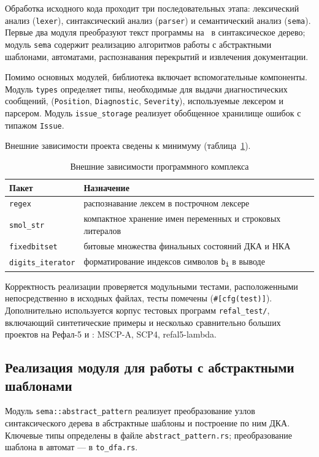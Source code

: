 Обработка исходного кода проходит три последовательных этапа: лексический анализ (\texttt{lexer}), синтаксический анализ (\texttt{parser}) и семантический анализ (\texttt{sema}).
Первые два модуля преобразуют текст программы на \RL\ в синтаксическое дерево; модуль \texttt{sema} содержит реализацию алгоритмов работы с абстрактными шаблонами, автоматами, распознавания перекрытий и извлечения документации.

Помимо основных модулей, библиотека включает вспомогательные компоненты.
Модуль \texttt{types} определяет типы, необходимые для выдачи диагностических сообщений, (\texttt{Position}, \texttt{Diagnostic}, \texttt{Severity}), используемые лексером и парсером.
Модуль \texttt{issue\_storage} реализует обобщенное хранилище ошибок с типажом \texttt{Issue}.

Внешние зависимости проекта сведены к минимуму (таблица~\ref{tab:deps}).

\begin{table}[htbp]
\centering
\caption{Внешние зависимости программного комплекса}
\label{tab:deps}
\begin{tabular}{@{}ll@{}}
\toprule
Пакет & Назначение \\
\midrule
\texttt{regex} & распознавание лексем в построчном лексере \\
\texttt{smol\_str} & компактное хранение имен переменных и строковых литералов \\
\texttt{fixedbitset} & битовые множества финальных состояний ДКА и НКА \\
\texttt{digits\_iterator} & форматирование индексов символов \texttt{b\textsubscript{i}} в выводе \\
\bottomrule
\end{tabular}
\end{table}

Корректность реализации проверяется модульными тестами, расположенными непосредственно в исходных файлах, тесты помечены (\texttt{\#[cfg(test)]}).
Дополнительно используется корпус тестовых программ \texttt{refal\_test/}, включающий синтетические примеры и несколько сравнительно больших проектов на Рефал-5 и \RL : MSCP-A, SCP4, refal5-lambda.

\subsection{Реализация модуля для работы с абстрактными шаблонами}

Модуль \texttt{sema::abstract\_pattern} реализует преобразование узлов синтаксического дерева в абстрактные шаблоны и построение по ним ДКА.
Ключевые типы определены в файле \texttt{abstract\_pattern.rs}; преобразование шаблона в автомат --- в \texttt{to\_dfa.rs}.

